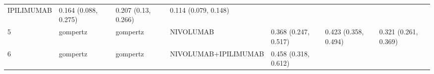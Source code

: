 \documentclass[
]{article}
\begin{document}
\begin{longtable}[]{@{}lllllll@{}}
\begin{minipage}[t]{0.15\columnwidth}
IPILIMUMAB\strut
\end{minipage} & \begin{minipage}[t]{0.15\columnwidth}\raggedright
0.164 (0.088, 0.275)\strut
\end{minipage} & \begin{minipage}[t]{0.15\columnwidth}\raggedright
0.207 (0.13, 0.266)\strut
\end{minipage} & \begin{minipage}[t]{0.15\columnwidth}\raggedright
0.114 (0.079, 0.148)\strut
\end{minipage}\tabularnewline
\begin{minipage}[t]{0.03\columnwidth}\raggedright
5\strut
\end{minipage} & \begin{minipage}[t]{0.09\columnwidth}\raggedright
gompertz\strut
\end{minipage} & \begin{minipage}[t]{0.09\columnwidth}\raggedright
gompertz\strut
\end{minipage} & \begin{minipage}[t]{0.15\columnwidth}\raggedright
NIVOLUMAB\strut
\end{minipage} & \begin{minipage}[t]{0.15\columnwidth}\raggedright
0.368 (0.247, 0.517)\strut
\end{minipage} & \begin{minipage}[t]{0.15\columnwidth}\raggedright
0.423 (0.358, 0.494)\strut
\end{minipage} & \begin{minipage}[t]{0.15\columnwidth}\raggedright
0.321 (0.261, 0.369)\strut
\end{minipage}\tabularnewline
\begin{minipage}[t]{0.03\columnwidth}\raggedright
6\strut
\end{minipage} & \begin{minipage}[t]{0.09\columnwidth}\raggedright
gompertz\strut
\end{minipage} & \begin{minipage}[t]{0.09\columnwidth}\raggedright
gompertz\strut
\end{minipage} & \begin{minipage}[t]{0.15\columnwidth}\raggedright
NIVOLUMAB+IPILIMUMAB\strut
\end{minipage} & \begin{minipage}[t]{0.15\columnwidth}\raggedright
0.458 (0.318, 0.612)\strut
\end{minipage} & \begin{minipage}[t]{0.15\columnwidth}\raggedright

\end{minipage}
\end{longtable}
\end{document}
